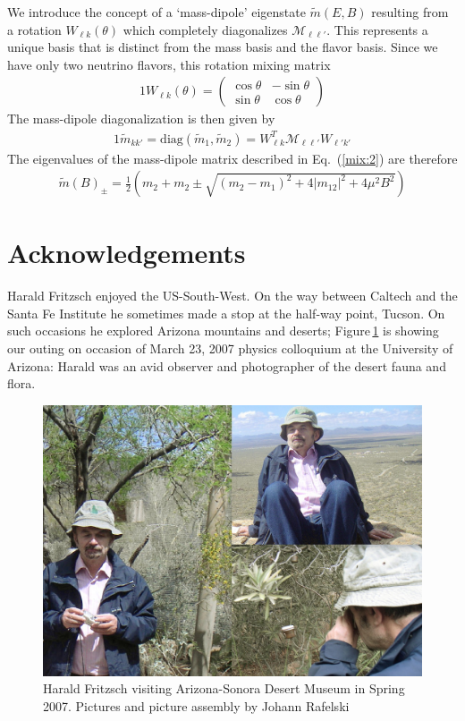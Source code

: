 \documentclass[addchapnum]{ws-rv961x669} %
\newcommand{\req}[1]{Eq.~(\ref{#1})}
\begin{document}
We introduce the concept of a `mass-dipole' eigenstate $\tilde{m}(E,B)$ resulting from a rotation $W_{\ell k}(\theta)$ which completely diagonalizes $\mathcal{M}_{\ell\ell'}$. This represents a unique basis that is distinct from the mass basis and the flavor basis. Since we have only two neutrino flavors, this rotation mixing matrix
\begin{alignat}{1}
	\label{mix:4} W_{\ell k}(\theta) = 
	\begin{pmatrix}
		\cos{\theta} & -\sin{\theta}\\
		\sin{\theta} & \cos{\theta}
	\end{pmatrix}
\end{alignat}
The mass-dipole diagonalization is then given by
\begin{alignat}{1}
	\label{mix:5} \tilde{m}_{kk'} = \mathrm{diag}(\tilde{m}_{1},\tilde{m}_{2})=W_{\ell k}^{T}\mathcal{M}_{\ell\ell'}W_{\ell'k'}
\end{alignat}
The eigenvalues of the mass-dipole matrix described in \req{mix:2} are therefore
\begin{align}
    \label{eigenvalue:1}
    \tilde{m}(B)_{\pm}=\frac{1}{2}\left(m_{2}+m_{2}\pm\sqrt{(m_{2}-m_{1})^{2}+4\left\rvert m_{12}\right\rvert^{2}+4\mu^{2}B^{2}}\right)
\end{align}

\section*{Acknowledgements}
Harald Fritzsch enjoyed the US-South-West. On the way between Caltech and the Santa Fe Institute he sometimes made a stop at the half-way point, Tucson. On such occasions he explored Arizona mountains and  deserts; Figure\,\ref{Fig:AZcolloq2007} is showing our outing on occasion of March 23, 2007 physics colloquium at the University of Arizona: Harald was an avid observer and photographer of the desert fauna and flora. 
 
\begin{figure}%
\centerline{\includegraphics[width=0.95\columnwidth]{07March24HaraldCollageDesertMuseum.jpg}}
\caption{Harald Fritzsch visiting Arizona-Sonora Desert Museum in Spring 2007. Pictures and picture assembly by Johann Rafelski
}
\label{Fig:AZcolloq2007} 
\end{figure}
\end{document}
